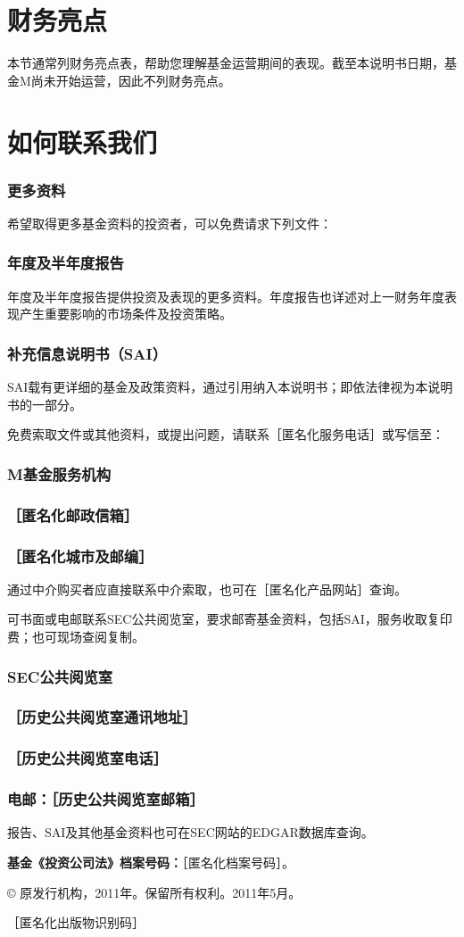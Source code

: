 \documentclass[UTF8,fontset=none,11pt,a4paper]{ctexart}
\begin{document}
\par{}\label{originalpage28}
\section*{财务亮点}\label{unitU951}
本节通常列财务亮点表，帮助您理解基金运营期间的表现。截至本说明书日期，基金M尚未开始运营，因此不列财务亮点。


\section*{如何联系我们}\label{unitU955}
\subsubsection*{更多资料}
希望取得更多基金资料的投资者，可以免费请求下列文件：

\subsubsection*{年度及半年度报告}
年度及半年度报告提供投资及表现的更多资料。年度报告也详述对上一财务年度表现产生重要影响的市场条件及投资策略。

\subsubsection*{补充信息说明书（SAI）}
SAI载有更详细的基金及政策资料，通过引用纳入本说明书；即依法律视为本说明书的一部分。

免费索取文件或其他资料，或提出问题，请联系［匿名化服务电话］或写信至：

\subsubsection*{M基金服务机构}
\subsubsection*{［匿名化邮政信箱］}
\subsubsection*{［匿名化城市及邮编］}
通过中介购买者应直接联系中介索取，也可在［匿名化产品网站］查询。

可书面或电邮联系SEC公共阅览室，要求邮寄基金资料，包括SAI，服务收取复印费；也可现场查阅复制。

\subsubsection*{SEC公共阅览室}
\subsubsection*{［历史公共阅览室通讯地址］}
\subsubsection*{［历史公共阅览室电话］}
\subsubsection*{电邮：［历史公共阅览室邮箱］}
报告、SAI及其他基金资料也可在SEC网站的EDGAR数据库查询。

\textbf{基金《投资公司法》档案号码：}［匿名化档案号码］。

© 原发行机构，2011年。保留所有权利。2011年5月。


［匿名化出版物识别码］
\end{document}
